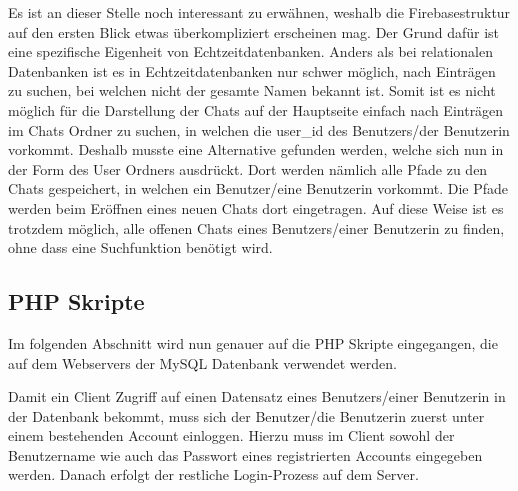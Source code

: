 \documentclass[../main.tex]{subfiles}
\begin{document}
	Es ist an dieser Stelle noch interessant zu erwähnen, weshalb die Firebasestruktur auf den ersten Blick etwas überkompliziert erscheinen mag. Der Grund dafür ist eine spezifische Eigenheit von Echtzeitdatenbanken. Anders als bei relationalen Datenbanken ist es in Echtzeitdatenbanken nur schwer möglich, nach Einträgen zu suchen, bei welchen nicht der gesamte Namen bekannt ist. Somit ist es nicht möglich für die Darstellung der Chats auf der Hauptseite einfach nach Einträgen im Chats Ordner zu suchen, in welchen die user\_id des Benutzers/der Benutzerin vorkommt. Deshalb musste eine Alternative gefunden werden, welche sich nun in der Form des User Ordners ausdrückt. Dort werden nämlich alle Pfade zu den Chats gespeichert, in welchen ein Benutzer/eine Benutzerin vorkommt. Die Pfade werden beim Eröffnen eines neuen Chats dort eingetragen. Auf diese Weise ist es trotzdem möglich, alle offenen Chats eines Benutzers/einer Benutzerin zu finden, ohne dass eine Suchfunktion benötigt wird.
	
	
	\subsection{PHP Skripte}
	Im folgenden Abschnitt wird nun genauer auf die PHP Skripte eingegangen, die auf dem Webservers der MySQL Datenbank verwendet werden.
	
	 Damit ein Client Zugriff auf einen Datensatz eines Benutzers/einer Benutzerin in der Datenbank bekommt, muss sich der Benutzer/die Benutzerin zuerst unter einem bestehenden Account einloggen. Hierzu muss im Client sowohl der Benutzername wie auch das Passwort eines registrierten Accounts eingegeben werden. Danach erfolgt der restliche Login-Prozess auf dem Server.
	 
\end{document}
